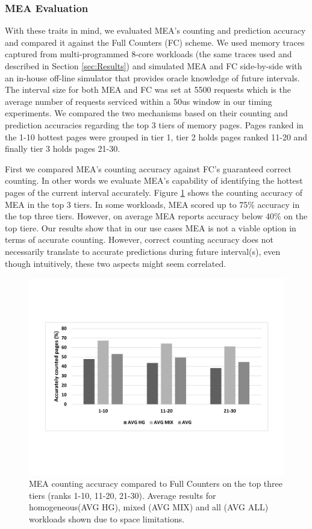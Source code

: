 \subsubsection*{MEA Evaluation}

With these traits in mind, we evaluated MEA's counting and prediction accuracy and compared it against the Full Counters (FC) scheme. We used memory traces captured from multi-programmed 8-core workloads (the same traces used and described in Section \ref{sec:Results}) and simulated MEA and FC side-by-side with an in-house off-line simulator that provides oracle knowledge of future intervals. The interval size for both MEA and FC was set at 5500 requests which is the average number of requests serviced within a 50us window in our timing experiments. We compared the two mechanisms based on their counting and prediction accuracies regarding the top 3 tiers of memory pages. Pages ranked in the 1-10 hottest pages were grouped in tier 1, tier 2 holds pages ranked 11-20 and finally tier 3 holds pages 21-30. 

First we compared MEA's counting accuracy against FC's guaranteed correct counting. In other words we evaluate MEA's capability of identifying the hottest pages of the current interval accurately. Figure \ref{fig:mea_1} shows the counting accuracy of MEA in the top 3 tiers. In some workloads, MEA scored up to 75\% accuracy in the top three tiers. However, on average MEA reports accuracy below 40\% on the top tiere. Our results show that in our use cases MEA is not a viable option in terms of accurate counting. However, correct counting accuracy does not necessarily translate to accurate predictions during future interval(s), even though intuitively, these two aspects might seem correlated.

\begin{figure}[t]
\centering
  \includegraphics[scale=.3]{figures/mea_1_v2.pdf}
  \caption{MEA counting accuracy compared to Full Counters on the top three tiers (ranks 1-10, 11-20, 21-30). Average results for homogeneous(AVG HG), mixed (AVG MIX) and all (AVG ALL) workloads shown due to space limitations.}
  \label{fig:mea_1}
\end{figure}

